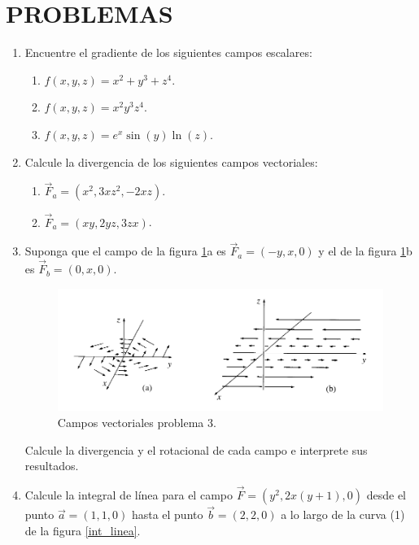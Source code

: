 \documentclass{article}
\begin{document}
\section*{PROBLEMAS}
\begin{enumerate}

\item Encuentre el gradiente de los siguientes campos escalares:

\begin{enumerate}
\item $f(x,y,z)=x^{2}+y^{3}+z^{4}.$
\item $f(x,y,z)=x^{2}y^{3}z^{4}.$
\item $f(x,y,z)=e^{x}\sin(y)\ln(z).$
\end{enumerate}

\item Calcule la divergencia de los siguientes campos vectoriales:
\begin{enumerate}
\item $\vec{F}_{a}=(x^{2},3xz^{2},-2xz)$.
\item $\vec{F}_{a}=(xy,2yz,3zx)$.
\end{enumerate}
\pagebreak
\item Suponga que el campo de la figura \ref{rot-div}a es $\vec{F}_{a}=(-y,x,0)$ y el de la figura \ref{rot-div}b es $\vec{F}_{b}=(0,x,0)$.

\begin{figure}[H]
\centering
\includegraphics[scale=0.5]{rotacional-divergencia.png}
\caption{Campos vectoriales problema 3.}
\label{rot-div}
\end{figure}

Calcule la divergencia y el rotacional de cada campo e interprete sus resultados.

\item Calcule la integral de línea para el campo $\vec{F}=(y^2,2x(y+1),0)$ desde el punto $\vec{a}=(1,1,0)$ hasta el punto $\vec{b}=(2,2,0)$ a lo largo de la curva (1) de la figura \ref{int_linea}.


\end{enumerate}
\end{document}
